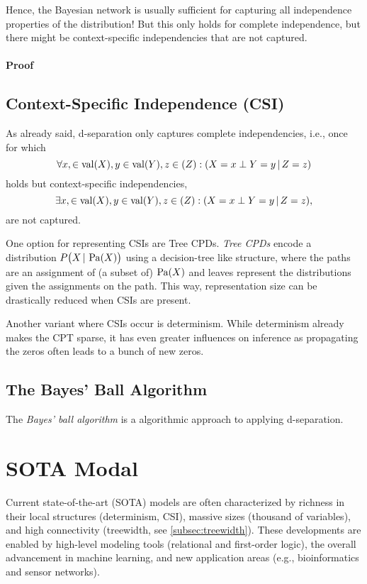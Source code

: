 				Hence, the Bayesian network is usually sufficient for capturing all independence properties of the distribution! But this only holds for complete independence, but there might be context-specific independencies that are not captured.

				\paragraph{Proof} %

		\subsection{Context-Specific Independence (CSI)}
			As already said, d-separation only captures complete independencies, i.e., once for which
			\begin{equation}
				\forall x, \in \operatorname{val}(X), y \in \operatorname{val}(Y), z \in (Z) : (X = x \perp Y = y \,\vert\, Z = z)
			\end{equation}
			holds but context-specific independencies,
			\begin{equation}
				\exists x, \in \operatorname{val}(X), y \in \operatorname{val}(Y), z \in (Z) : (X = x \perp Y = y \,\vert\, Z = z),
			\end{equation}
			are not captured.

			One option for representing CSIs are Tree CPDs. \emph{Tree CPDs} encode a distribution \( P\bigl(X \,\vert\, \operatorname{Pa}(X) \bigr) \) using a decision-tree like structure, where the paths are an assignment of (a subset of) \( \operatorname{Pa}(X) \) and leaves represent the distributions given the assignments on the path. This way, representation size can be drastically reduced when CSIs are present.

			Another variant where CSIs occur is determinism. While determinism already makes the CPT sparse, it has even greater influences on inference as propagating the zeros often leads to a bunch of new zeros.

		\subsection{The Bayes' Ball Algorithm} %
			The \emph{Bayes' ball algorithm} is a algorithmic approach to applying d-separation.

	\section{SOTA Modal}
		Current state-of-the-art (SOTA) models are often characterized by richness in their local structures (determinism, CSI), massive sizes (thousand of variables), and high connectivity (treewidth, see \autoref{subsec:treewidth}). These developments are enabled by high-level modeling tools (relational and first-order logic), the overall advancement in machine learning, and new application areas (e.g., bioinformatics and sensor networks).


